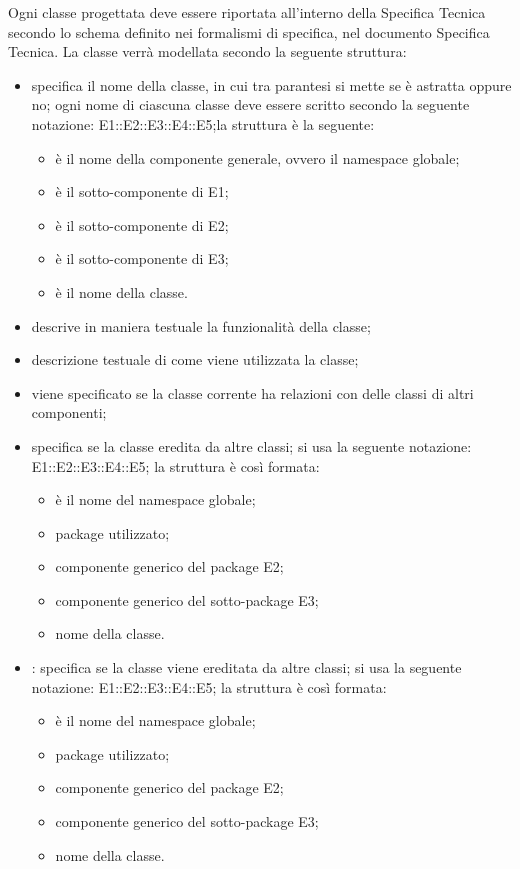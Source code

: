 Ogni classe progettata deve essere riportata all'interno della Specifica Tecnica secondo lo schema definito nei formalismi di specifica, nel documento Specifica Tecnica. La classe verrà modellata secondo la seguente struttura:
\begin{itemize}
\item {}specifica il nome della classe, in cui tra parantesi si mette se è astratta oppure no; ogni nome di ciascuna classe deve essere scritto secondo la seguente notazione: E1::E2::E3::E4::E5;la struttura è la seguente:
\begin{itemize}
\item {}è il nome della componente generale, ovvero il namespace globale;
\item {}è il sotto-componente di E1;
\item {}è il sotto-componente di E2;
\item {}è il sotto-componente di E3;
\item {}è il nome della classe.
\end{itemize}
\item {}descrive in maniera testuale la funzionalità della classe;
\item {}descrizione testuale di come viene utilizzata la classe;
\item {}viene specificato se la classe corrente ha relazioni con delle classi di altri componenti;
\item {}specifica se la classe eredita da altre classi; si usa la seguente notazione: E1::E2::E3::E4::E5; la struttura è così formata:
\begin{itemize}
\item {}è il nome del namespace globale;
\item {}package utilizzato;
\item {}componente generico del package E2;
\item {}componente generico del sotto-package E3;
\item {}nome della classe.
\end{itemize}
\item {}: specifica se la classe viene ereditata da altre classi; si usa la seguente notazione: E1::E2::E3::E4::E5; la struttura è così formata:
\begin{itemize}
\item {}è il nome del namespace globale;
\item {}package utilizzato;
\item {}componente generico del package E2;
\item {}componente generico del sotto-package E3;
\item {}nome della classe.
\end{itemize}
\end{itemize}


